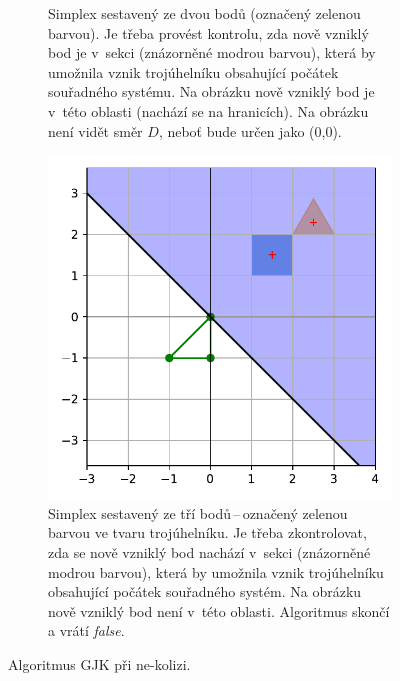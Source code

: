 \begin{figure}
\begin{subfigure}[t]{0.3\textwidth}
    \caption{Simplex sestavený ze dvou bodů (označený zelenou barvou). Je třeba provést kontrolu, zda nově vzniklý bod je v~sekci (znázorněné modrou barvou), která by umožnila vznik trojúhelníku obsahující počátek souřadného systému. Na obrázku nově vzniklý bod je v~této oblasti (nachází se na hranicích). Na obrázku není vidět směr $D$, neboť bude určen jako (0,0).}
    \label{fig:gjk_line}
\end{subfigure}
\hfill
\begin{subfigure}[t]{0.3\textwidth}
    \centering
    \includegraphics[scale=0.5]{obrazky-figures/gjk/gjk_triangle_bad.pdf}
    \caption{Simplex sestavený ze tří bodů\,--\,označený zelenou barvou ve tvaru trojúhelníku. Je třeba zkontrolovat, zda se nově vzniklý bod nachází v~sekci (znázorněné modrou barvou), která by umožnila vznik trojúhelníku obsahující počátek souřadného systém. Na obrázku nově vzniklý bod není v~této oblasti. Algoritmus skončí a vrátí \emph{false}.}
    \label{fig:gjk_triangle}
     \end{subfigure}

    \caption{Algoritmus GJK při ne-kolizi.}
\end{figure}


